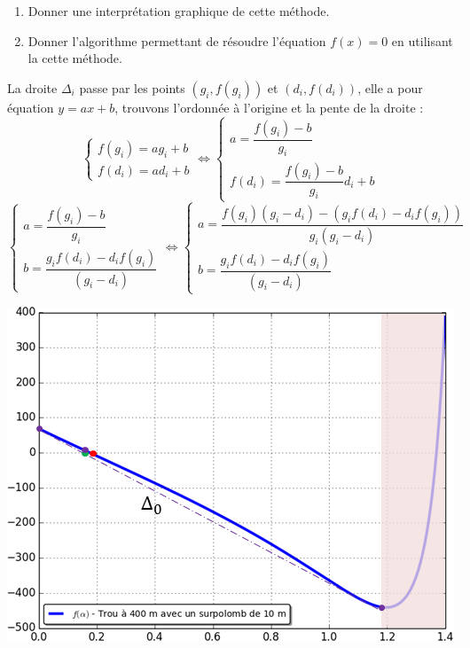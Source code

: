 \documentclass[10pt]{article}
\begin{document}
\begin{enumerate}
\item Donner une interprétation graphique de cette méthode.
\item Donner l'algorithme permettant de résoudre l'équation $f(x)=0$ en utilisant la cette méthode.
\end{enumerate}

\begin{minipage}[c]{.49\linewidth}
La droite $\Delta_i$ passe par les points $(g_i,f(g_i))$ et $(d_i,f(d_i))$, elle a pour équation $y=ax + b$, trouvons l'ordonnée à l'origine et la pente de la droite :
$$
\left\{
\begin{array}{l}
f(g_i) = a g_i + b \\
f(d_i) = a d_i + b 
\end{array}
\right.
\Longleftrightarrow
\left\{
\begin{array}{l}
a = \dfrac{f(g_i)-b}{g_i} \\
f(d_i) =  \dfrac{f(g_i)-b}{g_i}d_i + b 
\end{array}
\right.
$$ 
$$
\left\{
\begin{array}{l}
a = \dfrac{f(g_i)-b}{g_i} \\
b = \dfrac{g_i f(d_i) -d_if(g_i) }{(g_i  -d_i)}
\end{array}
\right.
\Longleftrightarrow
\left\{
\begin{array}{l}
a = \dfrac{f(g_i)(g_i  -d_i)- (g_i f(d_i) -d_if(g_i) )}{g_i(g_i-d_i)} \\
b = \dfrac{g_i f(d_i) -d_if(g_i) }{(g_i  -d_i)}
\end{array}
\right.
$$ 
\end{minipage} \hfill
\begin{minipage}[c]{.43\linewidth}
\begin{center}
\includegraphics[width=.9\textwidth]{images/InterpretationG2}
\end{center}
\end{minipage}
\vspace{.25cm}
\end{document}
